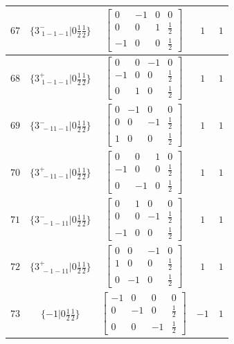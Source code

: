 \documentclass[fleqn,8pt]{jsarticle}
\begin{document}
\begin{longtable}{ccccc}
$ 67 $ & $ \{3^{-}_{\,\,1-1-1}|0 \frac{1}{2} \frac{1}{2}\} $ & $ \begin{bmatrix} 0 & -1 & 0 & 0 \\ 0 & 0 & 1 & \frac{1}{2} \\ -1 & 0 & 0 & \frac{1}{2} \end{bmatrix} $ & $ 1 $ & $ 1 $ \\ \hline
$ 68 $ & $ \{3^{+}_{\,\,1-1-1}|0 \frac{1}{2} \frac{1}{2}\} $ & $ \begin{bmatrix} 0 & 0 & -1 & 0 \\ -1 & 0 & 0 & \frac{1}{2} \\ 0 & 1 & 0 & \frac{1}{2} \end{bmatrix} $ & $ 1 $ & $ 1 $ \\ \hline
$ 69 $ & $ \{3^{-}_{\,\,-11-1}|0 \frac{1}{2} \frac{1}{2}\} $ & $ \begin{bmatrix} 0 & -1 & 0 & 0 \\ 0 & 0 & -1 & \frac{1}{2} \\ 1 & 0 & 0 & \frac{1}{2} \end{bmatrix} $ & $ 1 $ & $ 1 $ \\ \hline
$ 70 $ & $ \{3^{+}_{\,\,-11-1}|0 \frac{1}{2} \frac{1}{2}\} $ & $ \begin{bmatrix} 0 & 0 & 1 & 0 \\ -1 & 0 & 0 & \frac{1}{2} \\ 0 & -1 & 0 & \frac{1}{2} \end{bmatrix} $ & $ 1 $ & $ 1 $ \\ \hline
$ 71 $ & $ \{3^{-}_{\,\,-1-11}|0 \frac{1}{2} \frac{1}{2}\} $ & $ \begin{bmatrix} 0 & 1 & 0 & 0 \\ 0 & 0 & -1 & \frac{1}{2} \\ -1 & 0 & 0 & \frac{1}{2} \end{bmatrix} $ & $ 1 $ & $ 1 $ \\ \hline
$ 72 $ & $ \{3^{+}_{\,\,-1-11}|0 \frac{1}{2} \frac{1}{2}\} $ & $ \begin{bmatrix} 0 & 0 & -1 & 0 \\ 1 & 0 & 0 & \frac{1}{2} \\ 0 & -1 & 0 & \frac{1}{2} \end{bmatrix} $ & $ 1 $ & $ 1 $ \\ \hline
$ 73 $ & $ \{-1|0 \frac{1}{2} \frac{1}{2}\} $ & $ \begin{bmatrix} -1 & 0 & 0 & 0 \\ 0 & -1 & 0 & \frac{1}{2} \\ 0 & 0 & -1 & \frac{1}{2} \end{bmatrix} $ & $ -1 $ & $ 1 $ \\ \hline

\end{longtable}
\end{document}
